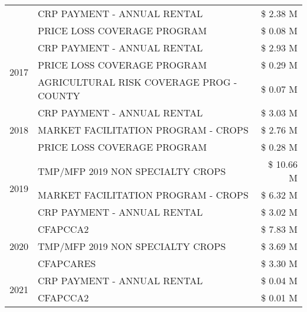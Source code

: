 \begin{tabular}{llr}
 & CRP PAYMENT - ANNUAL RENTAL & \$ 2.38 M \\
 & PRICE LOSS COVERAGE PROGRAM & \$ 0.08 M \\
\cline{1-3}
\multirow[t]{3}{*}{2017} & CRP PAYMENT - ANNUAL RENTAL & \$ 2.93 M \\
 & PRICE LOSS COVERAGE PROGRAM & \$ 0.29 M \\
 & AGRICULTURAL RISK COVERAGE PROG - COUNTY & \$ 0.07 M \\
\cline{1-3}
\multirow[t]{3}{*}{2018} & CRP PAYMENT - ANNUAL RENTAL & \$ 3.03 M \\
 & MARKET FACILITATION PROGRAM - CROPS & \$ 2.76 M \\
 & PRICE LOSS COVERAGE PROGRAM & \$ 0.28 M \\
\cline{1-3}
\multirow[t]{3}{*}{2019} & TMP/MFP 2019 NON SPECIALTY CROPS & \$ 10.66 M \\
 & MARKET FACILITATION PROGRAM - CROPS & \$ 6.32 M \\
 & CRP PAYMENT - ANNUAL RENTAL & \$ 3.02 M \\
\cline{1-3}
\multirow[t]{3}{*}{2020} & CFAPCCA2 & \$ 7.83 M \\
 & TMP/MFP 2019 NON SPECIALTY CROPS & \$ 3.69 M \\
 & CFAPCARES & \$ 3.30 M \\
\cline{1-3}
\multirow[t]{2}{*}{2021} & CRP PAYMENT - ANNUAL RENTAL & \$ 0.04 M \\
 & CFAPCCA2 & \$ 0.01 M \\
\cline{1-3}
\bottomrule
\end{tabular}
